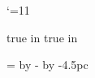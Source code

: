 \catcode`\@=11
%
%

\newdimen\textblock@odd@left
\newdimen\textblock@even@left

\def\setspinemargin#1{
  \textblock@odd@left=#1
  \textblock@even@left=\pdfpagewidth
    \advance\textblock@even@left by -\hsize
    \advance\textblock@even@left by -#1
}

\pdfhorigin=0pt
\pdfvorigin=0pt
 true in
 true in
\hsize=22pc
\vsize=39pc
\voffset=4.5pc

\setspinemargin{4.5pc}

%
%

\newif\ifclearedpage
\newif\ifdisplaypage

\def\facingpages{%
  \ifclearedpage\headline={\line{}}\footline={\line{}}\fi%
  \ifdisplaypage\headline={\line{}}\footline={\displaypagefootline}\fi%
  \global\clearedpagefalse%
  \global\displaypagefalse%
  \dimen0=\ifodd\pageno\textblock@odd@left\else\textblock@even@left\fi%
  \shipout\vbox{\moveright\dimen0\vbox{\makeheadline\pagebody\makefootline}}%
  \advancepageno%
  \ifnum\outputpenalty>-20000 \else\dosupereject\fi%
}
\output{\facingpages}

%
%

\def\useemptyframethispage{\clearedpagetrue\displaypagefalse}
\def\usedisplayframethispage{\displaypagetrue\clearedpagefalse}

\def\useemptypageframes{
  \global\headline={\line{}}
  \global\footline={\line{}}
  \global\clearedpagefalse
  \global\displaypagefalse
}

\def\usenormalpageframes{
  \global\headline={\runningheaderfont\normalpageheadline}
  \global\footline={\runningheaderfont\normalpagefootline}
  \global\clearedpagefalse
  \global\displaypagefalse
}

\def\displaypagefootline{\runningheaderfont\hfil\folio\hfil}
\def\normalpageheadline{\ifodd\pageno\normaloddpageheadline\else\normalevenpageheadline\fi}
\def\normalpagefootline{\line{}}
\def\normaloddpageheadline{\title\hfil\folio}
\def\normalevenpageheadline{\folio\hfil\author}


